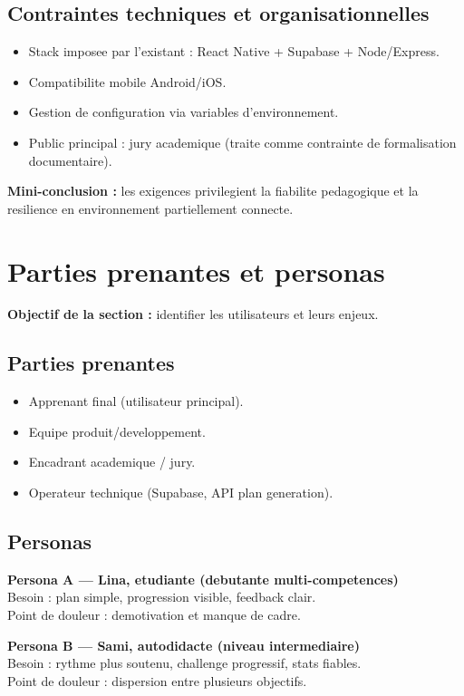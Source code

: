 \documentclass[12pt,a4paper]{article}
\begin{document}
\subsection{Contraintes techniques et organisationnelles}
\begin{itemize}
  \item Stack imposee par l'existant : React Native + Supabase + Node/Express.
  \item Compatibilite mobile Android/iOS.
  \item Gestion de configuration via variables d'environnement.
  \item Public principal : jury academique (traite comme contrainte de formalisation documentaire).
\end{itemize}

\textbf{Mini-conclusion :} les exigences privilegient la fiabilite pedagogique et la resilience en environnement partiellement connecte.

\section{Parties prenantes et personas}
\textbf{Objectif de la section :} identifier les utilisateurs et leurs enjeux.

\subsection{Parties prenantes}
\begin{itemize}
  \item Apprenant final (utilisateur principal).
  \item Equipe produit/developpement.
  \item Encadrant academique / jury.
  \item Operateur technique (Supabase, API plan generation).
\end{itemize}

\subsection{Personas}
\textbf{Persona A --- Lina, etudiante (debutante multi-competences)}\\
Besoin : plan simple, progression visible, feedback clair.\\
Point de douleur : demotivation et manque de cadre.

\textbf{Persona B --- Sami, autodidacte (niveau intermediaire)}\\
Besoin : rythme plus soutenu, challenge progressif, stats fiables.\\
Point de douleur : dispersion entre plusieurs objectifs.
\end{document}
